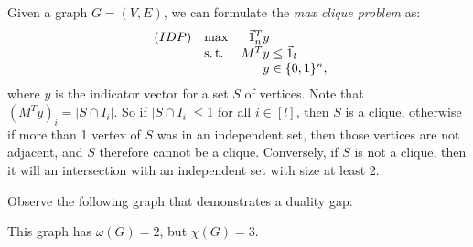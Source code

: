 \begin{defn}
    \label{def:max-clique-formulation}
    Given a graph $G = (V,E)$, we can formulate the \textit{max clique problem} as:
        \begin{equation*}
            \begin{array}{llr@{}l@{}}
                (IDP)   & \max  &   \one_n^T y  &               \\
                        & \st   &       M^T y   &{}\le \one_l   \\
                        &       &       y       &{}\in \{0,1\}^n,
            \end{array}
        \end{equation*}
    where $y$ is the indicator vector for a set $S$ of vertices. Note that $(M^T y)_i = |S \cap I_i|$. So if $|S \cap I_i| \le 1$ for all $i \in [l]$, then $S$ is a clique, otherwise if more than 1 vertex of $S$ was in an independent set, then those vertices are not adjacent, and $S$ therefore cannot be a clique. Conversely, if $S$ is not a clique, then it will an intersection with an independent set with size at least 2.
\end{defn}

\begin{exm}
    Observe the following graph that demonstrates a duality gap:
    \begin{center}
    \end{center}
    
    This graph has $\omega(G) = 2$, but $\chi(G) = 3$.
\end{exm}